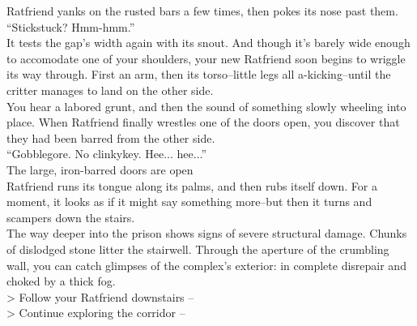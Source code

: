 Ratfriend yanks on the rusted bars a few times, then pokes its nose past them.\\

“Stickstuck? Hmm-hmm.”\\

It tests the gap’s width again with its snout. And though it’s barely wide enough to accomodate one of your shoulders, your new Ratfriend soon begins to wriggle its way through. First an arm, then its torso--little legs all a-kicking--until the critter manages to land on the other side.\\

You hear a labored grunt, and then the sound of something slowly wheeling into place. When Ratfriend finally wrestles one of the doors open, you discover that they had been barred from the other side.\\

“Gobblegore. No clinkykey. Hee... hee...”\\
 The large, iron-barred doors are open\\

Ratfriend runs its tongue along its palms, and then rubs itself down. For a moment, it looks as if it might say something more--but then it turns and scampers down the stairs.\\

The way deeper into the prison shows signs of severe structural damage. Chunks of dislodged stone litter the stairwell. Through the aperture of the crumbling wall, you can catch glimpses of the complex’s exterior: in complete disrepair and choked by a thick fog.\\

> Follow your Ratfriend downstairs -- \\
> Continue exploring the corridor -- 